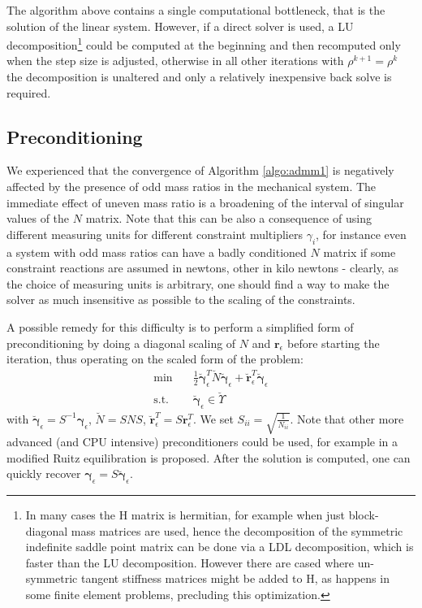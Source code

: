 \documentclass[final,3p]{elsarticle}
\newcommand{\vect}[1]{\bm{#1}}
\begin{document}
The algorithm above contains a single computational bottleneck, that is the solution of the linear system. However, if a direct solver is used, a LU decomposition\footnote{In many cases the H matrix is hermitian, for example when just block-diagonal mass matrices are used, hence the decomposition of the symmetric indefinite saddle point matrix can be done via a LDL decomposition, which is faster than the LU decomposition. However there are cased where un-symmetric tangent stiffness matrices might be added to H, as happens in some finite element problems, precluding this optimization.} could be computed at the beginning and then recomputed only when the step size is adjusted, otherwise in all other iterations with $\rho^{k+1}=\rho^{k}$ the decomposition is unaltered and only a relatively inexpensive back solve is required.


\subsection{Preconditioning}

We experienced that the convergence of Algorithm \ref{algo:admm1} is negatively affected by the presence of odd mass ratios in the mechanical system. The immediate effect of uneven mass ratio is a broadening of the interval of singular values of the $N$ matrix. Note that this can be also a consequence of using different measuring units for different constraint multipliers $\gamma_i$, for instance even a system with odd mass ratios can have a badly conditioned $N$ matrix if some constraint reactions are assumed in newtons, other in kilo newtons - clearly, as the choice of measuring units is arbitrary, one should find a way to make the solver as much insensitive as possible to the scaling of the constraints. 

A possible remedy for this difficulty is to perform a simplified form of preconditioning by doing a diagonal scaling of $N$ and $\vect{r}_\epsilon$ before starting the iteration, thus operating on the scaled form of the problem:
%
\begin{align}
	\text{min} \quad & \frac{1}{2} \breve{\vect{\gamma}}_\epsilon^T \breve{N} \breve{\vect{\gamma}}_\epsilon + \breve{\vect{r}}^T_\epsilon \breve{\vect{\gamma}}_\epsilon \\
	\text{s.t.} \quad & \breve{\vect{\gamma}}_\epsilon \in \breve{\Upsilon} 
	\label{eq:ChronoCCP_min_scaled}
\end{align}
%
with $\breve{\vect{\gamma}}_\epsilon = S^{-1} \vect{\gamma}_\epsilon$, $\breve{N} = S N S$, 
$\breve{\vect{r}}^T_\epsilon = S \vect{r}^T_\epsilon$. 
We set $S_{ii} = \sqrt{\frac{1}{N_{ii}}}$. 
Note that other more advanced (and CPU intensive) preconditioners could be used, for example in \cite{Stellato2020} a modified Ruitz equilibration is proposed.  
After the solution is computed, one can quickly recover $\vect{\gamma}_\epsilon = S \breve{\vect{\gamma}}_\epsilon$. 
\end{document}
